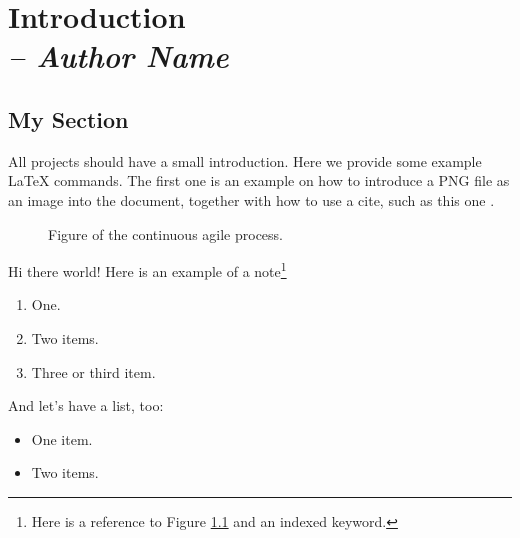 \chapter{Introduction \\
\small{\textit{-- Author Name}} 
\label{Chapter::Introduction}}

\section{My Section \label{Section::MySection}}

All projects should have a small introduction.  Here we provide some
example LaTeX commands.  The first one is an example on how to
introduce a PNG file as an image into the document, together with 
how to use a cite, such as this one \cite{GM1998}.

\begin{figure}
\centering
{}
\caption{\label{Figure::manAgile} Figure of the continuous agile process.}
\end{figure}

\newpage

Hi there world!  Here is an example of a note\footnote{Here is a reference 
to Figure \ref{Figure::manAgile} and an indexed keyword.}

\begin{enumerate}
\item One.
\item Two items.
\item Three or third item.
\end{enumerate}

And let's have a list, too:
\begin{itemize}
\item One item.
\item Two items.
\end{itemize}

